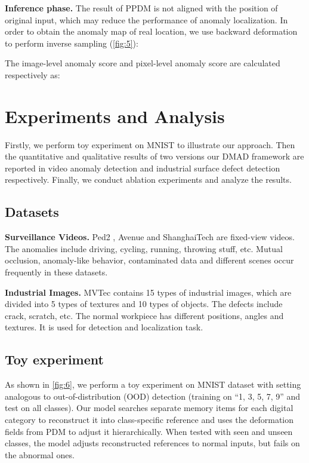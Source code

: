 \documentclass[10pt,twocolumn,letterpaper]{article}
\begin{document}
        \textbf{Inference phase.}
        The result of PPDM is not aligned with the position of original input, which may reduce the performance of anomaly localization. In order to obtain the anomaly map of real location, we use backward deformation to perform inverse sampling (\cref{fig:5}):
        
        
        The image-level anomaly score  and pixel-level anomaly score  are calculated respectively as:
                   
        
            
\section{Experiments and Analysis}
    Firstly, we perform toy experiment on MNIST to illustrate  our approach. Then the quantitative and qualitative results of two versions our DMAD framework are reported in video anomaly detection and industrial surface defect detection respectively. Finally, we conduct ablation experiments and analyze the results.
    \subsection{Datasets}
        \textbf{Surveillance Videos.} Ped2 \cite{ped2}, Avenue \cite{avenue} and ShanghaiTech \cite{timesparse} are fixed-view videos. The anomalies include driving, cycling, running, throwing stuff, etc. Mutual occlusion, anomaly-like behavior, contaminated data and different scenes occur frequently in these datasets.

        \textbf{Industrial Images.} MVTec \cite{mvtec} contains 15 types of industrial images, which are divided into 5 types of textures and 10 types of objects. The defects include crack, scratch, etc. The normal workpiece has different positions, angles and textures. It is used for detection and localization task.
    
    \subsection{Toy experiment}
        As shown in \cref{fig:6}, we perform a toy experiment on MNIST dataset \cite{mnist} with setting analogous to out-of-distribution (OOD) detection (\ie training on ``1, 3, 5, 7, 9'' and test on all classes). Our model searches separate memory items for each digital category to reconstruct it into class-specific reference and uses the deformation fields from PDM to adjust it hierarchically. When tested with seen and unseen classes, the model adjusts reconstructed references to normal inputs, but fails on the abnormal ones. 
\end{document}
